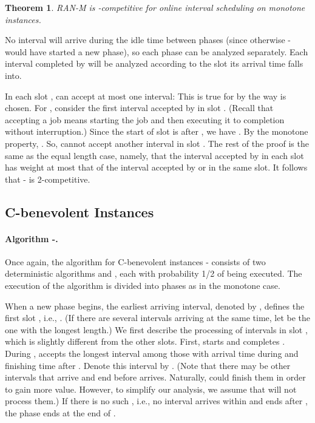 \documentclass[11pt]{article}
\newtheorem{theorem}{Theorem}[section]
\newcommand{\qed}{\hspace*{\fill}\par\medskip}
\newenvironment{proof}{\noindent{\it Proof. }\ignorespaces}{\qed}
\begin{document}
\begin{theorem}
RAN-M is -competitive for online interval scheduling on monotone instances.
\end{theorem}
\begin{proof}
No interval will arrive during the idle time between phases (since otherwise
- would have started a new phase), so each phase can be analyzed 
separately. Each interval completed by  will be analyzed according
to the slot its arrival time falls into.

In each slot ,  can accept at most one interval:
This is true for  by the way  is chosen.
For ,
consider the first interval  accepted by  in slot
.
(Recall that accepting a job means starting the job and then
executing it to completion without interruption.)
Since the start of slot  is after ,
we have .
By the monotone property, .
So,  cannot accept another interval in slot .
The rest of the proof is the same as the equal length case,
namely, that the interval accepted 
by  in each slot has weight at most that of the interval
accepted by  or  in the same slot.  
It follows that - is 2-competitive.  
\end{proof}

\subsection{C-benevolent Instances}

\paragraph{Algorithm -.}
Once again, the algorithm for C-benevolent instances
- consists of two deterministic algorithms  and ,
each with probability 1/2 of being executed.
The execution of the algorithm is divided into phases as in the monotone
case.

When a new phase begins,
the earliest arriving interval, denoted by , defines the
first slot , i.e., .
(If there are several intervals arriving at the same time,
let  be the one with the longest length.)
We first describe the processing of intervals in slot ,
which is slightly different from the other slots.
First,  starts and completes .  
During ,  accepts the longest interval among those
with arrival time during  and finishing time 
after . 
Denote this interval by .
(Note that there may be other intervals that arrive and end 
before  arrives. 
Naturally,  could finish them in order to gain more value.
However, to simplify our analysis, we assume that  will not
process them.)
If there is no such ,
i.e., no interval arrives within  and ends after ,
the phase ends at the end of .
\end{document}
